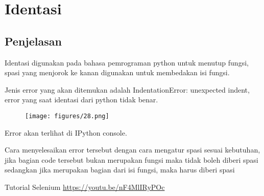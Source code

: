 \chapter{Identasi}
\section{Penjelasan}
Identasi digunakan pada bahasa pemrograman python untuk menutup fungsi, spasi yang menjorok ke kanan digunakan untuk membedakan isi fungsi.
\par 
Jenis error yang akan ditemukan adalah IndentationError: unexpected indent, error yang saat identasi dari python tidak benar.
\begin{figure}[H]
    \centering
    \texttt{[image: figures/28.png]}
    \label{28}
\end{figure}

Error akan terlihat di IPython console.

\par 
Cara menyelesaikan error tersebut dengan cara mengatur spasi sesuai kebutuhan, jika bagian code tersebut bukan merupakan fungsi maka tidak boleh diberi spasi sedangkan jika merupakan bagian dari isi fungsi, maka harus diberi spasi



Tutorial Selenium
\url{https://youtu.be/nF4MlIRyPOc}
